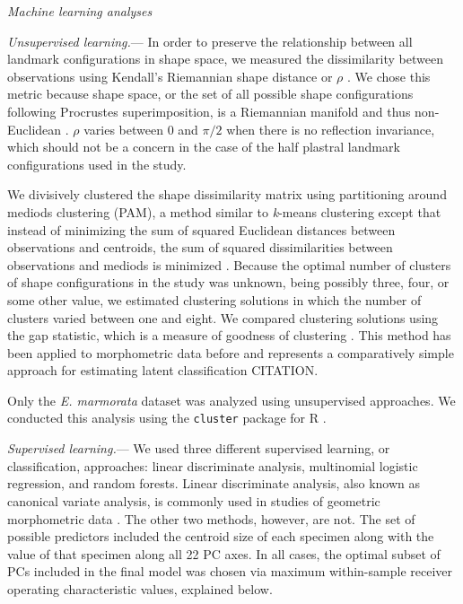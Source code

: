 \documentclass[12pt,letterpaper]{article}
\renewcommand{\subsection}[1]{%
\bigskip
\begin{center}
\begin{large}
\normalfont\itshape #1
\end{large}
\end{center}}
\renewcommand{\subsubsection}[1]{%
\vspace{2ex}
\noindent
\textit{#1.}---}
\begin{document}
\subsection{Machine learning analyses}
\subsubsection{Unsupervised learning}
In order to preserve the relationship between all landmark configurations in shape space, we measured the dissimilarity between observations using Kendall's Riemannian shape distance or \(\rho\) \citep{Kendall1984a,Dryden1998a}. We chose this metric because shape space, or the set of all possible shape configurations following Procrustes superimposition, is a Riemannian manifold and thus non-Euclidean \citep{Dryden1998a}. \(\rho\) varies between 0 and \(\pi / 2\) when there is no reflection invariance, which should not be a concern in the case of the half plastral landmark configurations used in the study.

We divisively clustered the shape dissimilarity matrix using partitioning around mediods clustering (PAM), a method similar to \textit{k}-means clustering except that instead of minimizing the sum of squared Euclidean distances between observations and centroids, the sum of squared dissimilarities between observations and mediods is minimized \citep{Kaufman1990}. Because the optimal number of clusters of shape configurations in the study was unknown, being possibly three, four, or some other value, we estimated clustering solutions in which the number of clusters varied between one and eight. We compared clustering solutions using the gap statistic, which is a measure of goodness of clustering \citep{Tibshirani2001a}. This method has been applied to morphometric data before and represents a comparatively simple approach for estimating latent classification CITATION.

Only the \textit{E. marmorata} dataset was analyzed using unsupervised approaches. We conducted this analysis using the \texttt{cluster} package for R \citep{Maechler2013}.

\subsubsection{Supervised learning}
We used three different supervised learning, or classification, approaches: linear discriminate analysis, multinomial logistic regression, and random forests. Linear discriminate analysis, also known as canonical variate analysis, is commonly used in studies of geometric morphometric data \citep{Zelditch2004,Mitteroecker2011}. The other two methods, however, are not. The set of possible predictors included the centroid size of each specimen along with the value of that specimen along all 22 PC axes. In all cases, the optimal subset of PCs included in the final model was chosen via maximum within-sample receiver operating characteristic values, explained below.
\end{document}
